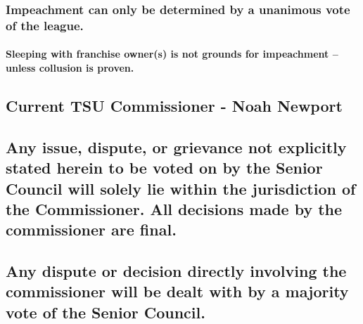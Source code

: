 \documentclass[]{book}
\let\oldparagraph\paragraph
\renewcommand{\paragraph}[1]{\oldparagraph{#1}\mbox{}}
\begin{document}
\hypertarget{impeachment-can-only-be-determined-by-a-unanimous-vote-of-the-league.}{%
\subsubsection{Impeachment can only be determined by a unanimous vote of the league.}\label{impeachment-can-only-be-determined-by-a-unanimous-vote-of-the-league.}}

\hypertarget{sleeping-with-franchise-owners-is-not-grounds-for-impeachment-unless-collusion-is-proven.}{%
\paragraph{Sleeping with franchise owner(s) is not grounds for impeachment -- unless collusion is proven.}\label{sleeping-with-franchise-owners-is-not-grounds-for-impeachment-unless-collusion-is-proven.}}

\hypertarget{current-tsu-commissioner---noah-newport}{%
\subsection{Current TSU Commissioner - Noah Newport}\label{current-tsu-commissioner---noah-newport}}

\hypertarget{any-issue-dispute-or-grievance-not-explicitly-stated-herein-to-be-voted-on-by-the-senior-council-will-solely-lie-within-the-jurisdiction-of-the-commissioner.-all-decisions-made-by-the-commissioner-are-final.}{%
\subsection{Any issue, dispute, or grievance not explicitly stated herein to be voted on by the Senior Council will solely lie within the jurisdiction of the Commissioner. All decisions made by the commissioner are final.}\label{any-issue-dispute-or-grievance-not-explicitly-stated-herein-to-be-voted-on-by-the-senior-council-will-solely-lie-within-the-jurisdiction-of-the-commissioner.-all-decisions-made-by-the-commissioner-are-final.}}

\hypertarget{any-dispute-or-decision-directly-involving-the-commissioner-will-be-dealt-with-by-a-majority-vote-of-the-senior-council.}{%
\subsection{Any dispute or decision directly involving the commissioner will be dealt with by a majority vote of the Senior Council.}\label{any-dispute-or-decision-directly-involving-the-commissioner-will-be-dealt-with-by-a-majority-vote-of-the-senior-council.}}
\end{document}
